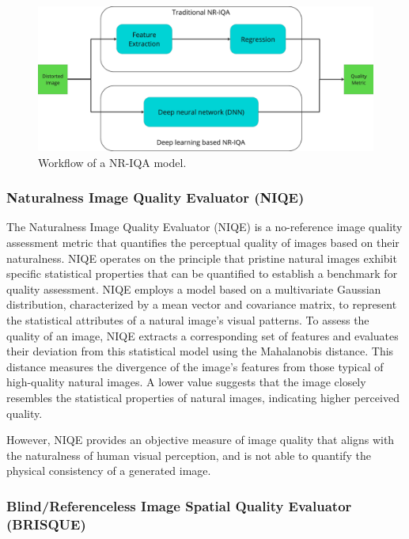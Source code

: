     \begin{figure}[h!]
        \centering
        \includegraphics[scale=0.25]{Includes/3-NR-IQA.pdf}
        \caption{Workflow of a NR-IQA model.}
        \label{fig:4-nr-iqa-workflow}
    \end{figure}


        

        \subsubsection{Naturalness Image Quality Evaluator (NIQE)}

        
            The Naturalness Image Quality Evaluator (NIQE) \cite{niqe} is a no-reference image quality assessment metric that quantifies the perceptual quality of images based on their naturalness.
            NIQE operates on the principle that pristine natural images exhibit specific statistical properties that can be quantified to establish a benchmark for quality assessment. 
            NIQE employs a model based on a multivariate Gaussian distribution, characterized by a mean vector and covariance matrix, to represent the statistical attributes of a natural image's visual patterns.
            To assess the quality of an image, NIQE extracts a corresponding set of features and evaluates their deviation from this statistical model using the Mahalanobis distance.
            This distance measures the divergence of the image's features from those typical of high-quality natural images.
            A lower value suggests that the image closely resembles the statistical properties of natural images, indicating higher perceived quality.
            
            However, NIQE provides an objective measure of image quality that aligns with the naturalness of human visual perception, and is not able to quantify the physical consistency of a generated image.
        \subsubsection{Blind/Referenceless Image Spatial Quality Evaluator (BRISQUE)}

